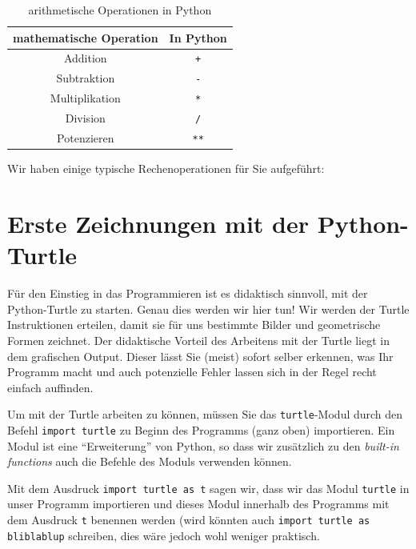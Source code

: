 \begin{myoverview}
	\begin{table}[H]
		\centering
		\begin{tabular}{c|c}
			\textbf{mathematische Operation} & \textbf{In Python} \\\midrule\midrule
			Addition                         & \lstinline|+|      \\\midrule
			Subtraktion                      & \lstinline|-|      \\\midrule
			Multiplikation                   & \lstinline|*|      \\\midrule
			Division                         & \lstinline|/|      \\\midrule
			Potenzieren                      & \lstinline|**|
		\end{tabular}
		\caption{arithmetische Operationen in Python}
		\label{tab:arithm-op}
	\end{table}
\end{myoverview}
\begin{myexample}\label{myexample:basisoperationen}
Wir haben einige typische Rechenoperationen für Sie aufgeführt:

\end{myexample}

\section{Erste Zeichnungen mit der Python-Turtle}
Für den Einstieg in das Programmieren ist es didaktisch sinnvoll, mit der Python-Turtle zu starten. Genau dies werden wir hier tun! Wir werden der Turtle Instruktionen erteilen, damit sie für uns bestimmte Bilder und geometrische Formen zeichnet. Der didaktische Vorteil des Arbeitens mit der Turtle liegt in dem grafischen Output. Dieser lässt Sie (meist) sofort selber erkennen, was Ihr Programm macht und auch potenzielle Fehler lassen sich in der Regel recht einfach auffinden.

Um mit der Turtle arbeiten zu können, müssen Sie das \lstinline|turtle|-Modul durch den Befehl \lstinline|import turtle| zu Beginn des Programms (ganz oben) importieren. Ein Modul ist eine \enquote{Erweiterung} von Python, so dass wir zusätzlich zu den \emph{built-in functions} auch die Befehle des Moduls verwenden können.

Mit dem Ausdruck \lstinline|import turtle as t| sagen wir, dass wir das Modul \lstinline|turtle| in unser Programm importieren und dieses Modul innerhalb des Programms mit dem Ausdruck \lstinline|t| benennen werden (wird könnten auch \lstinline|import turtle as bliblablup| schreiben, dies wäre jedoch wohl weniger praktisch.

